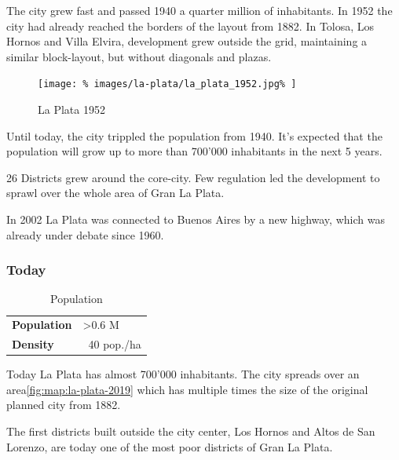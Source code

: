 \documentclass[twocolumn]{article}
\begin{document}
			The city grew fast and passed 1940 a quarter million of inhabitants.
			In 1952 the city had already reached the borders of the layout from 1882. In Tolosa, Los Hornos and Villa Elvira, development grew outside the grid, maintaining a similar block-layout, but without diagonals and plazas.
			
			\begin{figure}[H]
				\texttt{[image: \%
					images/la-plata/la\_plata\_1952.jpg\%
				]}
				\caption{La Plata 1952\cite{MOSP:InvestigacionHistorica}}
				\label{fig:map:la-plata-1952}
			\end{figure}
			
			
			Until today, the city trippled the population from 1940.
			It's expected that the population will grow up to more than 700'000 inhabitants in the next 5 years.
			
			
			
			26 Districts grew around the core-city. Few regulation led the development to sprawl over the whole area of Gran La Plata.
			
			In 2002 La Plata was connected to Buenos Aires by a new highway, which was already under debate since 1960.		
			
			
			\subsubsection{Today}
			
			\begin{table}[H]			
				\centering
				\caption{Population}
				\label{table:la-plata-population}
				\begin{tabular}{|l|l|}
					\hline
					\textbf{Population} & \textgreater 0.6 M \\
					\textbf{Density}    & ~40 pop./ha \\
					\hline
				\end{tabular}
			\end{table}
			
			Today La Plata has almost 700'000 inhabitants. The city spreads over an area\ref{fig:map:la-plata-2019} which has multiple times the size of the original planned city from 1882.
						
			The first districts built outside the city center, Los Hornos and Altos de San Lorenzo, are today one of the most poor districts of Gran La Plata.
			
\end{document}
